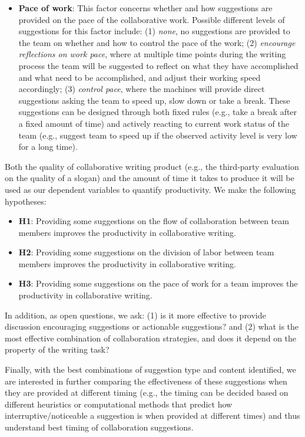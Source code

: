 {\begin{itemize}
\item {\bf Pace of work}: This factor concerns whether and how suggestions are provided on the pace of the collaborative work. Possible different levels of suggestions for this factor include: (1) {\em none}, no suggestions are provided to the team on whether and how to control the pace of the work; (2) {\em encourage reflections on work pace}, where at multiple time points during the writing process the team will be suggested to reflect on what they have accomplished and what need to be accomplished, and adjust their working speed accordingly; (3) {\em control pace}, where the machines will provide direct suggestions asking the team to speed up, slow down or take a break. These suggestions can be designed through both fixed rules (e.g., take a break after a fixed amount of time) and actively reacting to current work status of the team (e.g., suggest team to speed up if the observed activity level is very low for a long time). 
\end{itemize}
}

Both the quality of collaborative writing product (e.g., the third-party evaluation on the quality of a slogan) and the amount of time it takes to produce it will be used as our dependent variables to quantify productivity. %
We make the following hypotheses:
\begin{itemize}
\item{\bf H1}: Providing some suggestions on the flow of collaboration between team members improves the productivity in collaborative writing.
\item{\bf H2}: Providing some suggestions on the division of labor between team members improves the productivity in collaborative writing.
\item{\bf H3}: Providing some suggestions on the pace of work for a team improves the productivity in collaborative writing.
\end{itemize}
In addition, as open questions, we ask: (1) is it more effective to provide discussion encouraging suggestions or actionable suggestions? and (2) what is the most effective combination of collaboration strategies, and does it depend on the property of the writing task?

Finally, with the best combinations of suggestion type and content identified, we are interested in further comparing the effectiveness of these suggestions when they are provided at different timing (e.g., the timing can be decided based on different heuristics or computational methods that predict how interruptive/noticeable a suggestion is when provided at different times) and thus understand best timing of collaboration suggestions.

